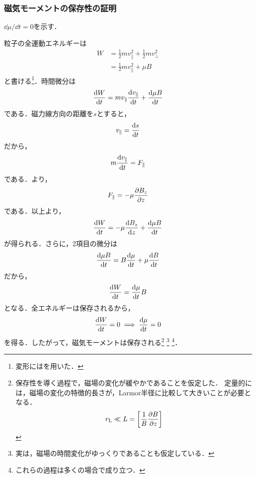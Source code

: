 \documentclass{report}
\begin{document}
      \subsubsection{磁気モーメントの保存性の証明}
      \label{sec:conservation-of-magnetic-moment}
        $\dd{\mu}/\dd{t} = 0$を示す．

        粒子の全運動エネルギーは
        \begin{align}
          W &= \frac{1}{2}mv_{\parallel}^2 + \frac{1}{2}mv_{\perp}^2\\
          &= \frac{1}{2}mv_{\parallel}^2 + \mu B
        \end{align}
        と書ける\footnote{変形にはを用いた．}．時間微分は
        \begin{align}
          \dv{W}{t} = mv_{\parallel}\dv{v_{\parallel}}{t} + \dv{\mu B}{t}
        \end{align}
        である．磁力線方向の距離を$s$とすると，
        \begin{align}
          v_\parallel = \dv{s}{t}
        \end{align}
        だから，
        \begin{align}
          m \dv{v_\parallel}{t} = F_\parallel
        \end{align}
        である．より，
        \begin{align}
          F_\parallel = -\mu \pdv{B_z}{z}
        \end{align}
        である．以上より，
        \begin{align}
          \dv{W}{t} = -\mu \dv{B_z}{z} + \dv{\mu B}{t}
        \end{align}
        が得られる．さらに，2項目の微分は
        \begin{align}
          \dv{\mu B}{t} = B\dv{\mu}{t} + \mu \dv{B}{t}
        \end{align}
        だから，
        \begin{align}
          \dv{W}{t} = \dv{\mu}{t}B
        \end{align}
        となる．全エネルギーは保存されるから，
        \begin{align}
          \dv{W}{t} = 0 \implies \dv{\mu}{t} = 0
        \end{align}
        を得る．したがって，磁気モーメントは保存される\footnote{保存性を導く過程で，磁場の変化が緩やかであることを仮定した．
        定量的には，磁場の変化の特徴的長さが，Larmor半径に比較して大きいことが必要となる．
        \begin{align}
          r_{\mathrm{L}} \ll L = \qty[\frac{1}{B}\pdv{B}{z}]
        \end{align}
        }
        \footnote{実は，磁場の時間変化がゆっくりであることも仮定している．}
        \footnote{これらの過程は多くの場合で成り立つ．}．
\end{document}
